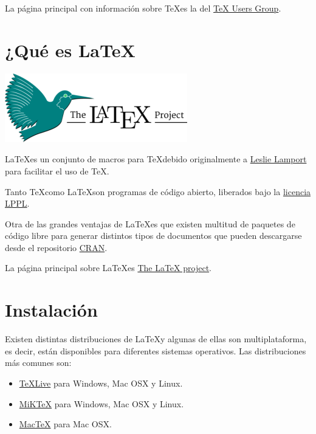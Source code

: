 \documentclass[
  letterpaper,
  DIV=11,
  numbers=noendperiod]{scrreport}
\providecommand{\tightlist}{%
  \setlength{\itemsep}{0pt}\setlength{\parskip}{0pt}}\usepackage{longtable,booktabs,array}
\begin{document}
La página principal con información sobre \TeX es la del
\href{https://www.tug.org/}{TeX Users Group}.

\hypertarget{quuxe9-es-latex}{%
\section{\texorpdfstring{¿Qué es
\LaTeX}{¿Qué es \textbackslash LaTeX}}\label{quuxe9-es-latex}}

\includegraphics{./img/logos/latex-project-logo.png}

\LaTeX es un conjunto de macros para \TeX debido originalmente a
\href{https://en.wikipedia.org/wiki/Leslie_Lamport}{Leslie Lamport} para
facilitar el uso de \TeX.

Tanto \TeX como \LaTeX son programas de código abierto,
liberados bajo la \href{https://www.latex-project.org/lppl.txt}{licencia
LPPL}.

Otra de las grandes ventajas de \LaTeX es que existen multitud de
paquetes de código libre para generar distintos tipos de documentos que
pueden descargarse desde el repositorio \href{https://ctan.org/}{CRAN}.

La página principal sobre \LaTeX es
\href{https://www.latex-project.org/}{The LaTeX project}.

\hypertarget{instalaciuxf3n}{%
\section{Instalación}\label{instalaciuxf3n}}

Existen distintas distribuciones de \LaTeX y algunas de ellas son
multiplataforma, es decir, están disponibles para diferentes sistemas
operativos. Las distribuciones más comunes son:

\begin{itemize}
\tightlist
\item
  \href{https://tug.org/texlive/}{TeXLive} para Windows, Mac OSX y
  Linux.
\item
  \href{}{MiKTeX} para Windows, Mac OSX y Linux.
\item
  \href{https://www.tug.org/mactex/}{MacTeX} para Mac OSX.
\end{itemize}
\end{document}
